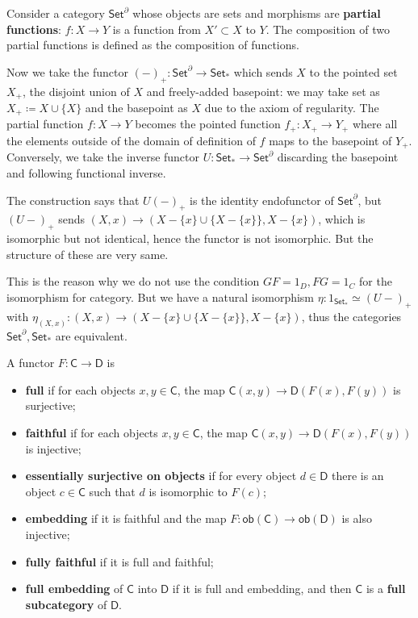 \begin{exmp}
Consider a category $\mathsf{Set}^{\partial}$ whose objects are sets and morphisms are \textbf{partial functions}: $f:X\rightarrow Y$ is a function from $X'\subset X$ to $Y$. The composition of two partial functions is defined as the composition of functions.

Now we take the functor $(-)_+:\mathsf{Set}^\partial \rightarrow \mathsf{Set}_*$ which sends $X$ to the pointed set $X_+$, the disjoint union of $X$ and freely-added basepoint: we may take set as $X_+\coloneqq X\cup \{X\}$ and the basepoint as $X$ due to the axiom of regularity. The partial function $f:X\rightarrow Y$ becomes the pointed function $f_+:X_+\rightarrow Y_+$ where all the elements outside of the domain of definition of $f$ maps to the basepoint of $Y_+$. Conversely, we take the inverse functor $U:\mathsf{Set}_*\rightarrow \mathsf{Set}^\partial$ discarding the basepoint and following functional inverse.

The construction says that $U(-)_+$ is the identity endofunctor of $\mathsf{Set}^\partial$, but $(U-)_+$ sends $(X,x)\rightarrow (X-\{x\}\cup \{X-\{x\}\},X-\{x\})$, which is isomorphic but not identical, hence the functor is not isomorphic. But the structure of these are very same.

This is the reason why we do not use the condition $GF=1_D,FG=1_C$ for the isomorphism for category. But we have a natural isomorphism $\eta:1_{\mathsf{Set}_*}\simeq (U-)_+$ with $\eta_{(X,x)}:(X,x)\rightarrow (X-\{x\}\cup \{X-\{x\}\},X-\{x\})$, thus the categories $\mathsf{Set}^\partial,\mathsf{Set}_*$ are equivalent.
\end{exmp}

\begin{defn} A functor $F:\mathsf{C}\rightarrow \mathsf{D}$ is
\begin{itemize}
\item \textbf{full} if for each objects $x,y\in \mathsf{C}$, the map $\mathsf{C}(x,y)\rightarrow \mathsf{D}(F(x),F(y))$ is surjective;
\item \textbf{faithful} if for each objects $x,y\in \mathsf{C}$, the map $\mathsf{C}(x,y)\rightarrow \mathsf{D}(F(x),F(y))$ is injective;
\item \textbf{essentially surjective on objects} if for every object $d\in \mathsf{D}$ there is an object $c\in\mathsf{C}$ such that $d$ is isomorphic to $F(c)$;
\item \textbf{embedding} if it is faithful and the map $F:\mathsf{ob}(\mathsf{C})\rightarrow \mathsf{ob}(\mathsf{D})$ is also injective;
\item \textbf{fully faithful} if it is full and faithful;
\item \textbf{full embedding} of $\mathsf{C}$ into $\mathsf{D}$ if it is full and embedding, and then $\mathsf{C}$ is a \textbf{full subcategory} of $\mathsf{D}$.
\end{itemize}
\end{defn}

